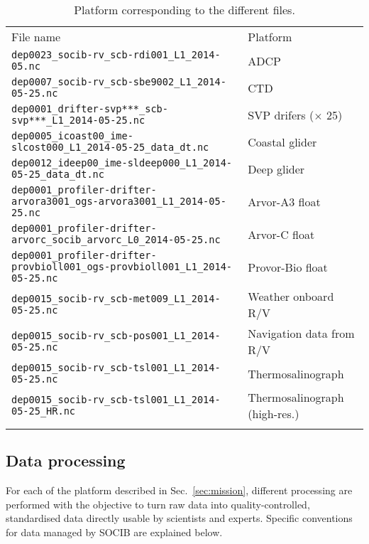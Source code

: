 \documentclass[essd]{copernicus}
\begin{document}
\begin{table*}[h]
\caption{Platform corresponding to the different files.\label{tab:filenales}}
\begin{tabular}{ll}
\tophline
File name				& Platform 															\\
\middlehline
\verb#dep0023_socib-rv_scb-rdi001_L1_2014-05.nc#					& ADCP								\\
\verb#dep0007_socib-rv_scb-sbe9002_L1_2014-05-25.nc#				& CTD 								\\
\verb#dep0001_drifter-svp***_scb-svp***_L1_2014-05-25.nc#			& SVP drifers ($\times$ 25)		\\
\verb#dep0005_icoast00_ime-slcost000_L1_2014-05-25_data_dt.nc#	& Coastal glider 					\\
\verb#dep0012_ideep00_ime-sldeep000_L1_2014-05-25_data_dt.nc#		& Deep glider 	 					\\
\verb#dep0001_profiler-drifter-arvora3001_ogs-arvora3001_L1_2014-05-25.nc#	& Arvor-A3 float		\\
\verb#dep0001_profiler-drifter-arvorc_socib_arvorc_L0_2014-05-25.nc# 			& Arvor-C float			\\
\verb#dep0001_profiler-drifter-provbioll001_ogs-provbioll001_L1_2014-05-25.nc# & Provor-Bio float	\\
\verb#dep0015_socib-rv_scb-met009_L1_2014-05-25.nc#				& Weather onboard  R/V 				\\
\verb#dep0015_socib-rv_scb-pos001_L1_2014-05-25.nc#				& Navigation data from R/V 		\\
\verb#dep0015_socib-rv_scb-tsl001_L1_2014-05-25.nc#				& Thermosalinograph					\\
\verb#dep0015_socib-rv_scb-tsl001_L1_2014-05-25_HR.nc#			& Thermosalinograph (high-res.)	\\
\bottomhline
\end{tabular}
\end{table*}

\subsection{Data processing\label{sec:processing}}

For each of the platform described in Sec.~\ref{sec:mission}, different processing are performed with the objective to turn raw data into quality-controlled, standardised data directly usable by scientists and experts. Specific conventions for data managed by SOCIB are explained below.
\end{document}
